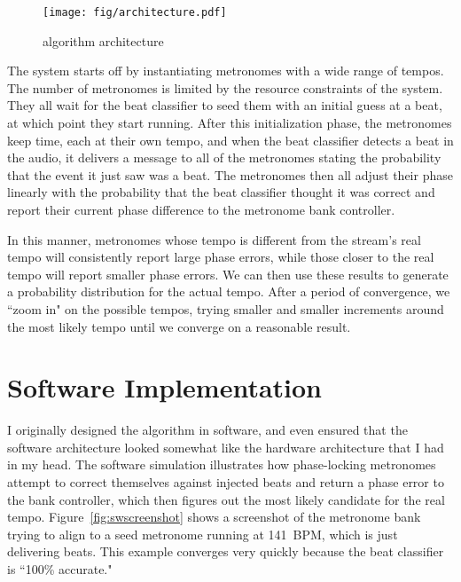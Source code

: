 \documentclass[letterpaper]{article}
\begin{document}
    \begin{figure}
        \centering
        \texttt{[image: fig/architecture.pdf]}
        \caption{\projname algorithm architecture}
        \label{fig:architecture}
    \end{figure}

    The system starts off by instantiating metronomes with a wide range of
    tempos.  The number of metronomes is limited by the resource constraints of
    the system.  They all wait for the beat classifier to seed them with an
    initial guess at a beat, at which point they start running.  After this
    initialization phase, the metronomes keep time, each at their own tempo,
    and when the beat classifier detects a beat in the audio, it delivers a
    message to all of the metronomes stating the probability that the event it
    just saw was a beat.  The metronomes then all adjust their phase linearly
    with the probability that the beat classifier thought it was correct and
    report their current phase difference to the metronome bank controller.

    In this manner, metronomes whose tempo is different from the stream's real
    tempo will consistently report large phase errors, while those closer to
    the real tempo will report smaller phase errors.  We can then use these
    results to generate a probability distribution for the actual tempo.  After
    a period of convergence, we ``zoom in" on the possible tempos, trying
    smaller and smaller increments around the most likely tempo until we
    converge on a reasonable result.


\section{Software Implementation}

    I originally designed the algorithm in software, and even ensured that the
    software architecture looked somewhat like the hardware architecture that I
    had in my head.  The software simulation illustrates how phase-locking
    metronomes attempt to correct themselves against injected beats and return
    a phase error to the bank controller, which then figures out the most
    likely candidate for the real tempo.  Figure~\ref{fig:swscreenshot} shows a
    screenshot of the metronome bank trying to align to a seed metronome
    running at 141~BPM, which is just delivering beats.  This example converges
    very quickly because the beat classifier is ``100\% accurate."
\end{document}
